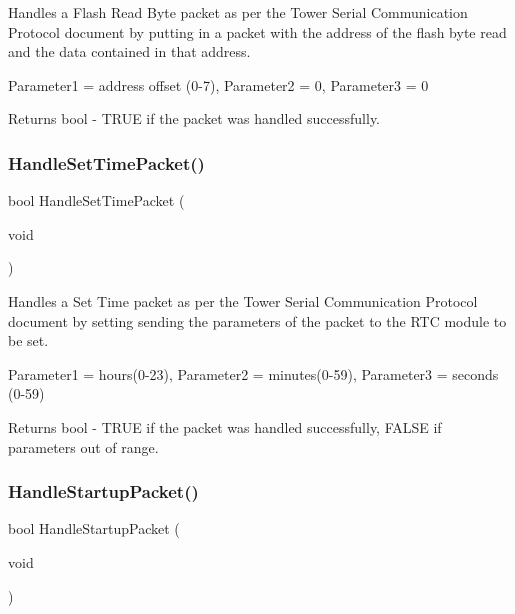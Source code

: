 Handles a Flash Read Byte packet as per the Tower Serial Communication Protocol document by putting in a packet with the address of the flash byte read and the data contained in that address. 

Parameter1 = address offset (0-\/7), Parameter2 = 0, Parameter3 = 0

\begin{DoxyReturn}{Returns}
bool -\/ T\+R\+UE if the packet was handled successfully. 
\end{DoxyReturn}
\mbox{\label{group__main__module_ga5e7670b320e43d8d708a92bbe0746eff}} 
\subsubsection{\texorpdfstring{Handle\+Set\+Time\+Packet()}{HandleSetTimePacket()}}
{\footnotesize\ttfamily bool Handle\+Set\+Time\+Packet (\begin{DoxyParamCaption}\item[{void}]{ }\end{DoxyParamCaption})}



Handles a Set Time packet as per the Tower Serial Communication Protocol document by setting sending the parameters of the packet to the R\+TC module to be set. 

Parameter1 = hours(0-\/23), Parameter2 = minutes(0-\/59), Parameter3 = seconds (0-\/59)

\begin{DoxyReturn}{Returns}
bool -\/ T\+R\+UE if the packet was handled successfully, F\+A\+L\+SE if parameters out of range. 
\end{DoxyReturn}
\mbox{\label{group__main__module_gaa028adfe8bbcabdb7897a1898874e141}} 
\subsubsection{\texorpdfstring{Handle\+Startup\+Packet()}{HandleStartupPacket()}}
{\footnotesize\ttfamily bool Handle\+Startup\+Packet (\begin{DoxyParamCaption}\item[{void}]{ }\end{DoxyParamCaption})}



